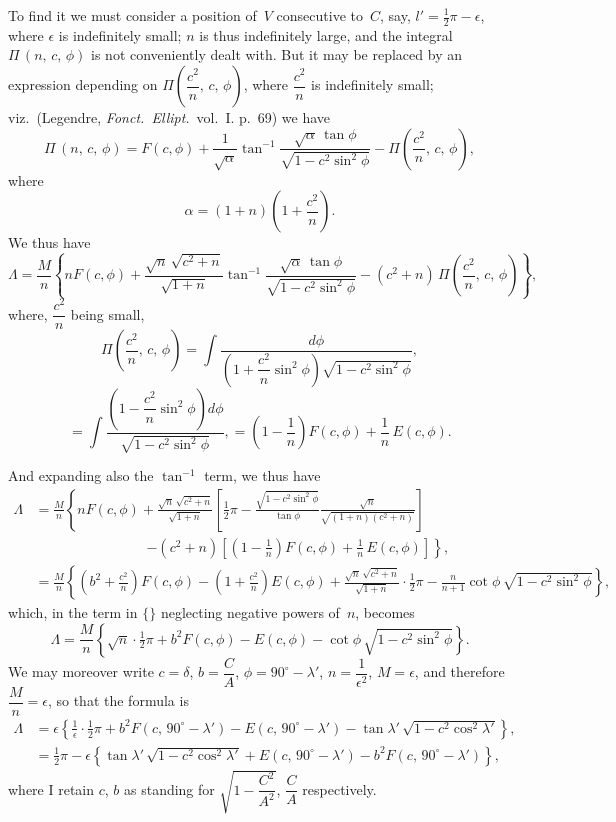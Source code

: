 \documentclass[11pt,a4paper]{article}
\theoremstyle{plain}
\theoremstyle{definition}
\begin{document}
To find it we must consider a position of~$V$ consecutive to~$C$, say, $l' = \tfrac{1}{2}\pi - \epsilon$,
where $\epsilon$ is indefinitely small; $n$ is thus indefinitely large, and the integral $\Pi\,(n,\,c,\,\phi)$ is not
conveniently dealt with.  But it may be replaced by an expression depending on
$\Pi\left(\dfrac{c^2}{n},\,c,\,\phi\right)$, where $\dfrac{c^2}{n}$ is indefinitely small; viz.\ (Legendre, \textit{Fonct.\ Ellipt.}\ vol.~I. p.~69)
we have
\[
\Pi\,(n,\,c,\,\phi) = F(c,\phi) + \frac{1}{\sqrt{\alpha}}\tan^{-1}
\frac{\sqrt{\alpha}\,\tan\phi}{\sqrt{1-c^2\sin^2\phi}}
- \Pi\left(\frac{c^2}{n},\,c,\,\phi\right),
\]
where
\[
\alpha = (1+n)\left(1+\frac{c^2}{n}\right).
\]
We thus have
\[
\Lambda = \frac{M}{n}\left\{nF(c,\phi) + \frac{\sqrt{n}\,\sqrt{c^2+n}}{\sqrt{1+n}}
\tan^{-1}\frac{\sqrt{\alpha}\,\tan\phi}{\sqrt{1-c^2\sin^2\phi}}
- (c^2+n)\,\Pi\left(\frac{c^2}{n},\,c,\,\phi\right)\right\},
\]
where, $\dfrac{c^2}{n}$ being small,
\[
\Pi\left(\frac{c^2}{n},\,c,\,\phi\right) =
\int\!\frac{d\phi}{\left(1+\dfrac{c^2}{n}\sin^2\phi\right)\sqrt{1-c^2\sin^2\phi}},
\]
\[
= \int\!\frac{\left(1-\dfrac{c^2}{n}\sin^2\phi\right)d\phi}{\sqrt{1-c^2\sin^2\phi}},
= \left(1-\frac{1}{n}\right)F(c,\phi) + \frac{1}{n}\,E(c,\phi).
\]

And expanding also the $\tan^{-1}$ term, we thus have
\begin{align*}
\Lambda &= \frac{M}{n}\left\{nF(c,\phi) + \frac{\sqrt{n}\,\sqrt{c^2+n}}{\sqrt{1+n}}
\left[\tfrac{1}{2}\pi - \frac{\sqrt{1-c^2\sin^2\phi}}{\tan\phi}
\frac{\sqrt{n}}{\sqrt{(1+n)(c^2+n)}}\right]\right. \\
&\qquad\qquad\qquad\qquad
\left. - (c^2+n)\left[\left(1-\frac{1}{n}\right)F(c,\phi) + \frac{1}{n}\,E(c,\phi)\right]\right\}, \\
&= \frac{M}{n}\left\{\left(b^2+\frac{c^2}{n}\right)F(c,\phi)
- \left(1+\frac{c^2}{n}\right)E(c,\phi)
+ \frac{\sqrt{n}\,\sqrt{c^2+n}}{\sqrt{1+n}} \cdot \tfrac{1}{2}\pi
- \frac{n}{n+1}\cot\phi\,\sqrt{1-c^2\sin^2\phi}\right\},
\end{align*}
which, in the term in $\{\}$ neglecting negative powers of~$n$, becomes
\[
\Lambda = \frac{M}{n}\left\{\sqrt{n} \cdot \tfrac{1}{2}\pi + b^2F(c,\phi) - E(c,\phi)
- \cot\phi\,\sqrt{1-c^2\sin^2\phi}\right\}.
\]
We may moreover write $c=\delta$, $b=\dfrac{C}{A}$, $\phi = 90^\circ-\lambda'$,
$n = \dfrac{1}{\epsilon^2}$, $M=\epsilon$, and therefore $\dfrac{M}{n}=\epsilon$, so
that the formula is
\begin{align*}
\Lambda &= \epsilon\left\{\frac{1}{\epsilon} \cdot \tfrac{1}{2}\pi
+ b^2F(c,\,90^\circ-\lambda') - E(c,\,90^\circ-\lambda')
- \tan\lambda'\,\sqrt{1-c^2\cos^2\lambda'}\right\}, \\
&= \tfrac{1}{2}\pi - \epsilon\left\{\tan\lambda'\,\sqrt{1-c^2\cos^2\lambda'}
+ E(c,\,90^\circ-\lambda') - b^2F(c,\,90^\circ-\lambda')\right\},
\end{align*}
where I retain $c$, $b$ as standing for $\sqrt{1-\dfrac{C^2}{A^2}}$, $\dfrac{C}{A}$ respectively.
\end{document}
